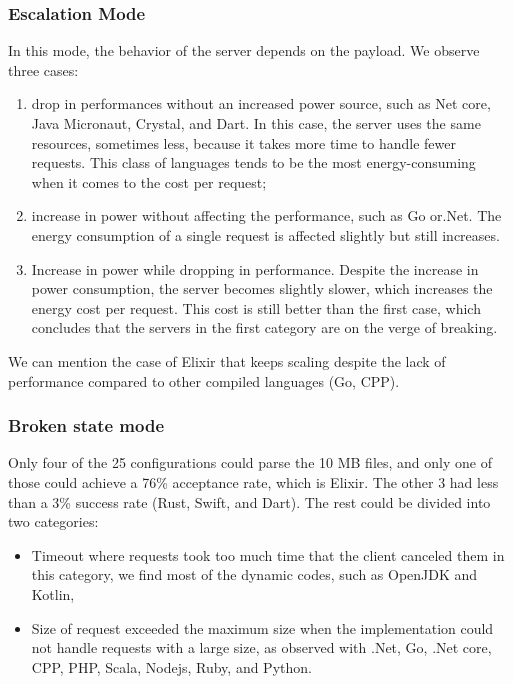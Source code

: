 \subsubsection{Escalation Mode}
In this mode, the behavior of the server depends on the payload. We observe three cases:
\begin{enumerate}
    \item drop in performances without an increased power source, such as Net core, Java Micronaut, Crystal, and Dart.
          In this case, the server uses the same resources, sometimes less, because it takes more time to handle fewer requests.
          This class of languages tends to be the most energy-consuming when it comes to the cost per request;
    \item increase in power without affecting the performance, such as Go or.Net.
          The energy consumption of a single request is affected slightly but still increases.
    \item Increase in power while dropping in performance.
          Despite the increase in power consumption, the server becomes slightly slower, which increases the energy cost per request.
          This cost is still better than the first case, which concludes that the servers in the first category are on the verge of breaking.
\end{enumerate}

We can mention the case of \textsf{Elixir} that keeps scaling despite the lack of performance compared to other compiled languages (Go, CPP).

\subsubsection{Broken state mode }
Only four of the 25 configurations could parse the 10 MB files, and only one of those could achieve a 76\% acceptance rate, which is Elixir. The other 3 had less than a 3\% success rate (Rust, Swift, and Dart).
The rest could be divided into two categories:
\begin{itemize}
    \item \textsf{Timeout} where requests took too much time that the client canceled them in this category, we find most of the dynamic codes, such as OpenJDK and Kotlin,
    \item \textsf{Size of request} exceeded the maximum size when the implementation could not handle requests with a large size, as observed with .Net, Go, .Net core, CPP, PHP, Scala, Nodejs, Ruby, and Python.
\end{itemize}


